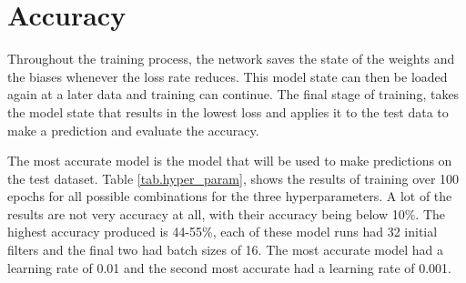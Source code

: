 \section{Accuracy}
Throughout the training process, the network saves the state of the weights and the biases whenever the loss rate reduces. This model state can then be loaded again at a later data and training can continue. The final stage of training, takes the model state that results in the lowest loss and applies it to the test data to make a prediction and evaluate the accuracy.
\par
The most accurate model is the model that will be used to make predictions on the test dataset. Table \ref{tab.hyper_param}, shows the results of training over 100 epochs for all possible combinations for the three hyperparameters. A lot of the results are not very accuracy at all, with their accuracy being below 10\%. The highest accuracy produced is 44-55\%, each of these model runs had 32 initial filters and the final two had batch sizes of 16. The most accurate model had a learning rate of 0.01 and the second most accurate had a learning rate of 0.001. 

